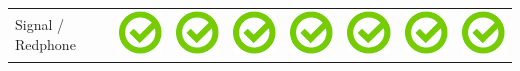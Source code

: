 \documentclass[10pt,foldmark,tumble]{leaflet}
\begin{document}
\begin{center}
{{\begin{tabular}{ L{2cm} | C{2cm} | C{2cm} | C{2cm} | C{2cm} | C{2cm} | C{2cm} | C{2cm} }
Signal / Redphone & \includegraphics[scale=0.1]{pics/haken.png} & \includegraphics[scale=0.1]{pics/haken.png} & \includegraphics[scale=0.1]{pics/haken.png} & \includegraphics[scale=0.1]{pics/haken.png} & \includegraphics[scale=0.1]{pics/haken.png} & \includegraphics[scale=0.1]{pics/haken.png} & \includegraphics[scale=0.1]{pics/haken.png} \tabularnewline

\end{tabular}}}
\end{center}
\end{document}

